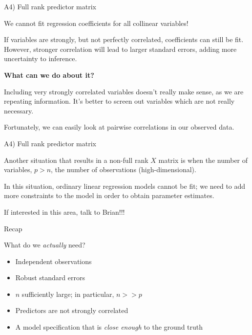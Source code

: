 \documentclass[12pt,ignorenonframetext,]{beamer}
\providecommand{\tightlist}{%
\setlength{\itemsep}{0pt}\setlength{\parskip}{0pt}}
\begin{document}
\begin{frame}{A4) Full rank predictor matrix}

We cannot fit regression coefficients for all collinear variables!

If variables are strongly, but not perfectly correlated, coefficients
can still be fit. However, stronger correlation will lead to larger
standard errors, adding more uncertainty to inference.

\pause
\textbf{What can we do about it?}

Including very strongly correlated variables doesn't really make sense,
as we are repeating information. It's better to screen out variables
which are not really necessary.

Fortunately, we can easily look at pairwise correlations in our observed
data.

\end{frame}

\begin{frame}{A4) Full rank predictor matrix}

Another situation that results in a non-full rank \(X\) matrix is when
the number of variables, \(p > n\), the number of observations
(\alert{high-dimensional}).

In this situation, ordinary linear regression models cannot be fit; we
need to add more constraints to the model in order to obtain parameter
estimates.

If interested in this area, talk to Brian!!!

\end{frame}

\begin{frame}{Recap}

What do we \textit{actually} need?

\pause

\begin{itemize}
\tightlist
\item
  Independent observations
\item
  Robust standard errors
\item
  \(n\) sufficiently large; in particular, \(n >> p\)
\item
  Predictors are not strongly correlated
\item
  A model specification that is \textit{close enough} to the ground
  truth
\end{itemize}

\end{frame}
\end{document}
